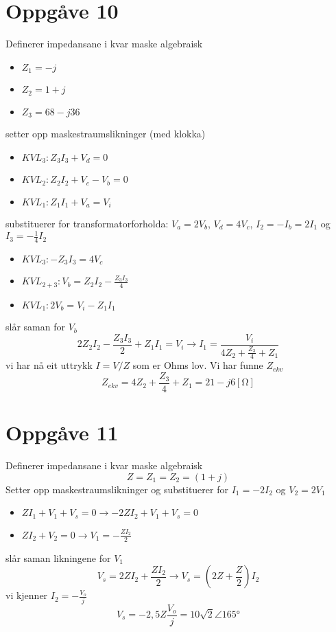 \documentclass[12pt,a4paper]{article}
\begin{document}
  \section*{Oppgåve 10}
    Definerer impedansane i kvar maske algebraisk
    \begin{itemize}
      \item $Z_1 = -j$
      \item $Z_2 = 1+j$
      \item $Z_3 = 68-j36$
    \end{itemize}
    setter opp maskestraumslikninger (med klokka)
    \begin{itemize}
      \item $KVL_3: Z_3I_3 + V_d = 0$
      \item $KVL_2: Z_2I_2 + V_c - V_b = 0$
      \item $KVL_1: Z_1I_1 + V_a = V_i$
    \end{itemize}
    substituerer for transformatorforholda: $V_a = 2V_b$, $V_d = 4V_c$, $I_2=-I_b = 2I_1$ og
    $I_3 = -\frac{1}{4}I_2$
    \begin{itemize}
      \item $KVL_3: -Z_3I_3 = 4V_c$
      \item $KVL_{2+3}: V_b = Z_2I_2 - \frac{Z_3I_3}{4}$
      \item $KVL_1: 2V_b = V_i - Z_1I_1$
    \end{itemize}
    slår saman for $V_b$
    \begin{equation}
      2Z_2I_2 - \frac{Z_3I_3}{2} + Z_1I_1 = V_i \rightarrow
      I_1 = \frac{V_i}{4Z_2 + \frac{Z_3}{4} + Z_1}
    \end{equation}
    vi har nå eit uttrykk $I = V/Z$ som er Ohms lov. Vi har funne $Z_{ekv}$
    \begin{equation}
      Z_{ekv} = 4Z_2 + \frac{Z_3}{4} + Z_1 = 21-j6[\si{\ohm}]
    \end{equation}


  \section*{Oppgåve 11}
    Definerer impedansane i kvar maske algebraisk
    \begin{equation}
      Z = Z_1 = Z_2 = (1+j)
    \end{equation}
    Setter opp maskestraumslikninger og
    substituerer for $I_1 = -2I_2$ og $V_2 = 2V_1$
    \begin{itemize}
      \item $ZI_1 + V_1 + V_s = 0 \rightarrow -2ZI_2 + V_1 + V_s = 0$
      \item $ZI_2 + V_2 = 0 \rightarrow V_1 = -\frac{ZI_2}{2}$
    \end{itemize}
    slår saman likningene for $V_1$
    \begin{equation}
      V_s = 2ZI_2 + \frac{ZI_2}{2} \rightarrow V_s = \left( 2Z + \frac{Z}{2} \right) I_2
    \end{equation}
    vi kjenner $I_2 = - \frac{V_o}{j}$
    \begin{equation}
      V_s = -2,5Z\frac{V_o}{j} = 10\sqrt{2}\angle\ang{165}
    \end{equation}
\end{document}
